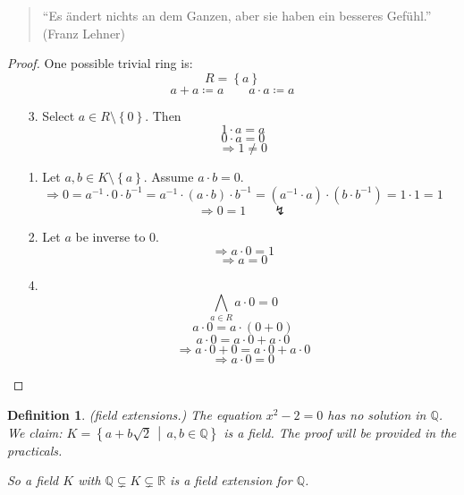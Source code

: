 \documentclass[a4paper,landscape,twocolumn]{article}
\newcommand\set[1]{\left\{#1\right\}}
\newcommand\setdef[2]{\left\{#1\,\middle|\,#2\right\}}
\newtheorem{defi}{Definition}
\begin{document}
\begin{quote}
  \begin{otherlanguage}{ngerman}
    \enquote{Es ändert nichts an dem Ganzen, aber sie haben ein besseres Gefühl.}
    (Franz Lehner)
  \end{otherlanguage}
\end{quote}

\begin{proof}
  One possible trivial ring is:
  \[ R = \set{a} \]
  \[ a + a \coloneqq a \qquad a \cdot a \coloneqq a \]

  \begin{enumerate}
    \item[3.]
      Select $a \in R \setminus \set{0}$. Then
      \[ 1 \cdot a = a \]
      \[ 0 \cdot a = 0 \]
      \[ \Rightarrow 1 \neq 0 \]
    \item[1.]
      Let $a, b \in K \setminus \set{a}$.
      Assume $a \cdot b = 0$.
      \[
        \Rightarrow 0 = a^{-1} \cdot 0 \cdot b^{-1}
        = a^{-1} \cdot (a \cdot b) \cdot b^{-1}
        = (a^{-1} \cdot a) \cdot (b \cdot b^{-1})
        = 1 \cdot 1
        = 1
      \] \[ \Rightarrow 0 = 1 \qquad\lightning \]
    \item[2.]
      Let $a$ be inverse to $0$.
      \[ \Rightarrow a \cdot 0 = 1 \]
      \[ \Rightarrow a = 0 \]
    \item[4.]
      \[ \bigwedge_{a \in R} a \cdot 0 = 0 \]
      \[ a \cdot 0 = a \cdot (0 + 0) \]
      \[ a \cdot 0 = a \cdot 0 + a \cdot 0 \]
      \[ \Rightarrow a \cdot 0 + 0 = a \cdot 0 + a \cdot 0 \]
      \[ \Rightarrow a \cdot 0 = 0 \]
  \end{enumerate}
\end{proof}

\begin{defi}
  \emph{(field extensions.)}
  The equation $x^2 - 2 = 0$ has no solution in $\mathbb Q$.
  We claim:
  $K = \setdef{a + b \sqrt{2}}{a,b \in \mathbb Q}$ is a field.
  The proof will be provided in the practicals.

  So a field $K$ with $\mathbb Q \subsetneq K \subsetneq \mathbb R$
  is a field extension for $\mathbb Q$.
\end{defi}
\end{document}
